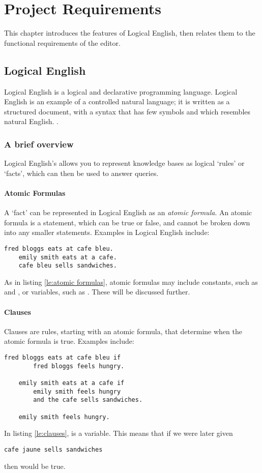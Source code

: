 \documentclass[../main.tex]{subfiles}
\begin{document}
\chapter{Project Requirements}
This chapter introduces the features of Logical English, then relates them to the functional requirements of the editor.
\section{Logical English}
Logical English is a logical and declarative programming language. Logical English is an example of a controlled natural language; it is written as a structured document, with a syntax that has few symbols and which resembles natural English. \cite{logical_english}.

\subsection{A brief overview}
Logical English's allows you to represent knowledge bases as logical `rules' or `facts', which can then be used to answer queries. 

\subsubsection{Atomic Formulas}
A `fact' can be represented in Logical English as an \textit{atomic formula}. An atomic formula is a statement, which can be true or false, and cannot be broken down into any smaller statements. Examples in Logical English include:
\begin{lstlisting}[language={LE},caption={An example of three atomic formulas in Logical English.},label={le:atomic formulas}]
    fred bloggs eats at cafe bleu.
    emily smith eats at a cafe.
    cafe bleu sells sandwiches.
\end{lstlisting}
As in listing \ref{le:atomic formulas}, atomic formulas may include constants, such as  and , or variables, such as . These will be discussed further.


\subsubsection{Clauses}
Clauses are rules, starting with an atomic formula, that determine when the atomic formula is true. Examples include:
\newpage
\begin{lstlisting}[language={LE},label={le:clauses}]
    fred bloggs eats at cafe bleu if
        fred bloggs feels hungry.

    emily smith eats at a cafe if
        emily smith feels hungry
        and the cafe sells sandwiches.

    emily smith feels hungry.
\end{lstlisting}
In listing \ref{le:clauses},  is a variable. This means that if we were later given 
\begin{lstlisting}[language={LE}]
    cafe jaune sells sandwiches
\end{lstlisting}
then  would be true.
\end{document}
